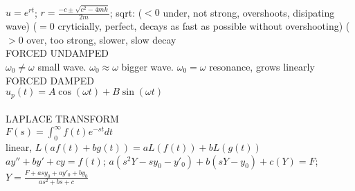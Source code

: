 \documentclass{article}
\begin{document}
\begin{large}
\\$u=e^{rt}$; $r=\frac{-c\pm\sqrt{c^2-4mk}}{2m}$; sqrt: ($<0$ under, not strong, overshoots, disipating wave) ($=0$ cryticially, perfect, decays as fast as possible without overshooting) ($>0$ over, too strong, slower, slow decay
\\FORCED UNDAMPED
\\$\omega_0\ne\omega$ small wave. $\omega_0\approx\omega$ bigger wave. $\omega_0=\omega$ resonance, grows linearly
\\FORCED DAMPED
\\$u_p(t)=A\cos(\omega t)+B\sin(\omega t)$
\\
\\LAPLACE TRANSFORM
\\$F(s)=\int_0^\infty f(t)e^{-st} dt$
\\linear, $L(af(t)+bg(t))=aL(f(t))+bL(g(t))$
\\$ay''+by'+cy=f(t)$; $a(s^2Y-sy_0-y'_0)+b(sY-y_0)+c(Y)=F$; $Y=\frac{F+asy_0+ay'_0+by_0}{as^2+bs+c}$
\end{large}
\end{document}
